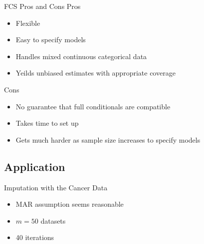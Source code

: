 \begin{frame}{FCS Pros and Cons}
Pros
 \begin{itemize}
  \item Flexible
  \item Easy to specify models
  \item Handles mixed continuous categorical data
  \item Yeilds unbiased estimates with appropriate coverage
 \end{itemize}

 Cons
 \begin{itemize}
  \item No guarantee that full conditionals are compatible
  \item Takes time to set up
  \item Gets much harder as sample size increases to specify models
 \end{itemize}

\end{frame}

\subsection{Application}
\begin{frame}{Imputation with the Cancer Data}

 \begin{itemize}
  \item MAR assumption seems reasonable
  \item $m=50$ datasets
  \item 40 iterations
 \end{itemize}

\end{frame}



